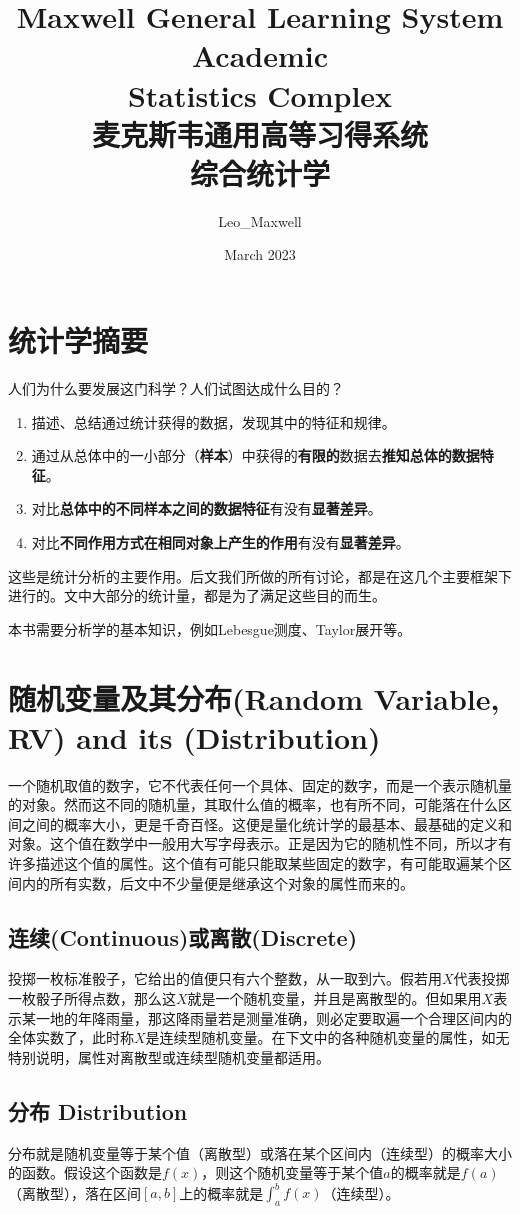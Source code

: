 \documentclass[UTF8]{ctexbook}
\title{Maxwell General Learning System Academic\\ Statistics Complex\\ 麦克斯韦通用高等习得系统\\ 综合统计学}
\author{Leo\_Maxwell }
\date{March 2023}
\begin{document}
\maketitle

\tableofcontents
\newpage

\chapter*{统计学摘要}
人们为什么要发展这门科学？人们试图达成什么目的？
\begin{enumerate}
	\item 描述、总结通过统计获得的数据，发现其中的特征和规律。
	\item 通过从总体中的一小部分（\textbf{样本}）中获得的\textbf{有限的}数据去\textbf{推知总体的数据特征}。
	\item 对比\textbf{总体中的不同样本之间的数据特征}有没有\textbf{显著差异}。
	\item 对比\textbf{不同作用方式在相同对象上产生的作用}有没有\textbf{显著差异}。
\end{enumerate}

这些是统计分析的主要作用。后文我们所做的所有讨论，都是在这几个主要框架下进行的。文中大部分的统计量，都是为了满足这些目的而生。

本书需要分析学的基本知识，例如Lebesgue测度、Taylor展开等。
\chapter{随机变量及其分布(Random Variable, RV) and its (Distribution)}
一个随机取值的数字，它不代表任何一个具体、固定的数字，而是一个表示随机量的对象。然而这不同的随机量，其取什么值的概率，也有所不同，可能落在什么区间之间的概率大小，更是千奇百怪。这便是量化统计学的最基本、最基础的定义和对象。这个值在数学中一般用大写字母表示。正是因为它的随机性不同，所以才有许多描述这个值的属性。这个值有可能只能取某些固定的数字，有可能取遍某个区间内的所有实数，后文中不少量便是继承这个对象的属性而来的。
\section{连续(Continuous)或离散(Discrete)}
投掷一枚标准骰子，它给出的值便只有六个整数，从一取到六。假若用$X$代表投掷一枚骰子所得点数，那么这$X$就是一个随机变量，并且是离散型的。但如果用$X$表示某一地的年降雨量，那这降雨量若是测量准确，则必定要取遍一个合理区间内的全体实数了，此时称$X$是连续型随机变量。在下文中的各种随机变量的属性，如无特别说明，属性对离散型或连续型随机变量都适用。
\section{分布 Distribution}
分布就是随机变量等于某个值（离散型）或落在某个区间内（连续型）的概率大小的函数。假设这个函数是$f(x)$，则这个随机变量等于某个值$a$的概率就是$f(a)$（离散型），落在区间$[a,b]$上的概率就是$\int_a^bf(x)$（连续型）。
\end{document}

